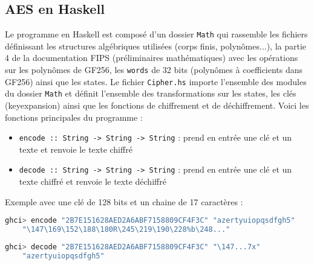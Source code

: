\documentclass[12pt]{article}
\begin{document}
\subsection{AES en Haskell}
Le programme en Haskell est composé d'un dossier \texttt{Math} qui rassemble les fichiers définissant les structures algébriques utilisées (corps finis, polynômes...), la partie 4 de la documentation FIPS (préliminaires mathématiques) avec les opérations sur les polynômes de GF256, les \texttt{words} de 32 bits (polynômes à coefficients dans GF256) ainsi que les states. Le fichier \texttt{Cipher.hs} importe l'ensemble des modules du dossier \texttt{Math} et définit l'ensemble des transformations sur les states, les clés (keyexpansion) ainsi que les fonctions de chiffrement et de déchiffrement. Voici les fonctions principales du programme :
\begin{itemize}
    \item \texttt{encode :: String -> String -> String} : prend en entrée une clé et un texte et renvoie le texte chiffré
    \item \texttt{decode :: String -> String -> String} : prend en entrée une clé et un texte chiffré et renvoie le texte déchiffré
\end{itemize}
Exemple avec une clé de 128 bits et un chaine de 17 caractères :
\begin{lstlisting}[language=Haskell]
    ghci> encode "2B7E151628AED2A6ABF7158809CF4F3C" "azertyuiopqsdfgh5"
    "\147\169\152\188\180R\245\219\190\228%b\248..."
\end{lstlisting}
\begin{lstlisting}[language=Haskell]
    ghci> decode "2B7E151628AED2A6ABF7158809CF4F3C" "\147...7x"
    "azertyuiopqsdfgh5"
\end{lstlisting}
\end{document}
